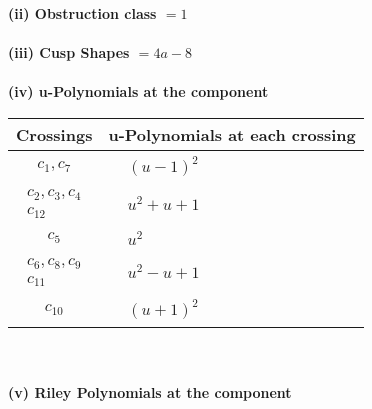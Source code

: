 \documentclass[1p]{elsarticle_modified}
\theoremstyle{definition}
\begin{document}
\flushleft \textbf{(ii) Obstruction class $= 1$}\\~\\
\flushleft \textbf{(iii) Cusp Shapes $= 4 a-8$}\\~\\
\newpage\renewcommand{\arraystretch}{1}
\flushleft \textbf{(iv) u-Polynomials at the component}\newline \\
\begin{tabular}{m{50pt}|m{274pt}}
Crossings & \hspace{64pt}u-Polynomials at each crossing \\
\hline $$\begin{aligned}c_{1},c_{7}\end{aligned}$$&$\begin{aligned}
&(u-1)^2
\end{aligned}$\\
\hline $$\begin{aligned}c_{2},c_{3},c_{4}\\c_{12}\end{aligned}$$&$\begin{aligned}
&u^2+u+1
\end{aligned}$\\
\hline $$\begin{aligned}c_{5}\end{aligned}$$&$\begin{aligned}
&u^2
\end{aligned}$\\
\hline $$\begin{aligned}c_{6},c_{8},c_{9}\\c_{11}\end{aligned}$$&$\begin{aligned}
&u^2- u+1
\end{aligned}$\\
\hline $$\begin{aligned}c_{10}\end{aligned}$$&$\begin{aligned}
&(u+1)^2
\end{aligned}$\\
\hline
\end{tabular}\\~\\
\newpage\renewcommand{\arraystretch}{1}
\flushleft \textbf{(v) Riley Polynomials at the component}\newline \\
\end{document}

